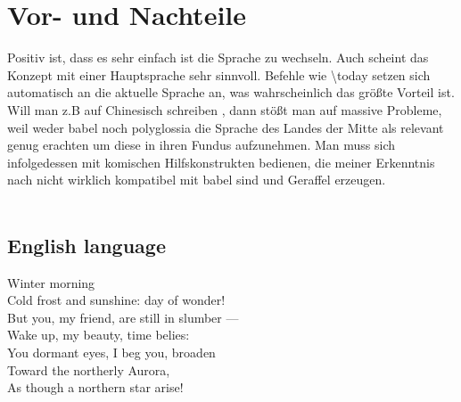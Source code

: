 \documentclass{scrartcl}
\begin{document}
\section{Vor- und Nachteile}
Positiv ist, dass es sehr einfach ist die Sprache zu wechseln. Auch scheint das Konzept mit einer Hauptsprache sehr sinnvoll. Befehle wie \textbackslash today setzen sich automatisch an die aktuelle Sprache an, was wahrscheinlich das größte Vorteil ist. Will man z.B auf Chinesisch schreiben , dann stößt man auf massive Probleme, weil weder babel noch polyglossia die Sprache des Landes der Mitte als relevant genug erachten um diese in ihren Fundus aufzunehmen. Man muss sich infolgedessen mit komischen Hilfskonstrukten bedienen, die meiner Erkenntnis nach nicht wirklich kompatibel mit babel sind und Geraffel erzeugen. \\
\\
\begin{otherlanguage}{english}
	\section*{English language}
	Winter morning\\
	Cold frost and sunshine: day of wonder! \\
	But you, my friend, are still in slumber — \\
	Wake up, my beauty, time belies: \\
	You dormant eyes, I beg you, broaden \\
	Toward the northerly Aurora, \\
	As though a northern star arise! \\
\end{otherlanguage}
\end{document}
